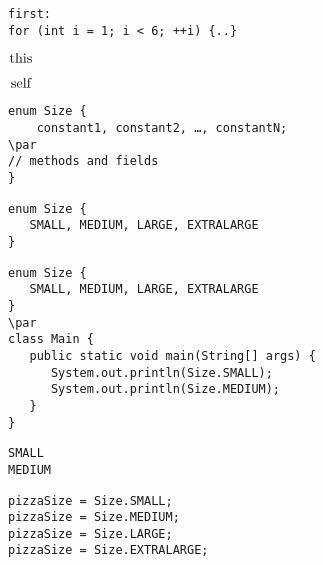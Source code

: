 \documentclass{book}
\def\lthtmlcheckvsize{\ifdim\ht\sizebox<\vsize 
  \ifdim\wd\sizebox<\hsize\expandafter\hfill\fi \expandafter\vfill
  \else\expandafter\vss\fi}%
\begin{document}
{\newpage\clearpage
{}%
\begin{lstlisting}
first:
for (int i = 1; i < 6; ++i) {..}
\end{lstlisting}%
\lthtmlfigureZ
\lthtmlcheckvsize\clearpage}

{\newpage\clearpage
{}%
$\lstinline{this}$%
\lthtmlindisplaymathZ
\lthtmlcheckvsize\clearpage}

{\newpage\clearpage
{}%
$\lstinline{self}$%
\lthtmlindisplaymathZ
\lthtmlcheckvsize\clearpage}

{\newpage\clearpage
{}%
\begin{lstlisting}
enum Size {
    constant1, constant2, …, constantN;
\par
// methods and fields	
}
\end{lstlisting}%
\lthtmlfigureZ
\lthtmlcheckvsize\clearpage}

{\newpage\clearpage
{}%
\begin{lstlisting}
enum Size { 
   SMALL, MEDIUM, LARGE, EXTRALARGE 
}
\end{lstlisting}%
\lthtmlfigureZ
\lthtmlcheckvsize\clearpage}

{\newpage\clearpage
{}%
\begin{lstlisting}
enum Size {
   SMALL, MEDIUM, LARGE, EXTRALARGE
}
\par
class Main {
   public static void main(String[] args) {
      System.out.println(Size.SMALL);
      System.out.println(Size.MEDIUM);
   }
}
\end{lstlisting}%
\lthtmlfigureZ
\lthtmlcheckvsize\clearpage}

{\newpage\clearpage
{}%
\begin{lstlisting}
SMALL
MEDIUM
\end{lstlisting}%
\lthtmlfigureZ
\lthtmlcheckvsize\clearpage}

{\newpage\clearpage
{}%
\begin{lstlisting}
pizzaSize = Size.SMALL;
pizzaSize = Size.MEDIUM;
pizzaSize = Size.LARGE;
pizzaSize = Size.EXTRALARGE;
\end{lstlisting}%
\lthtmlfigureZ
\lthtmlcheckvsize\clearpage}
\end{document}
